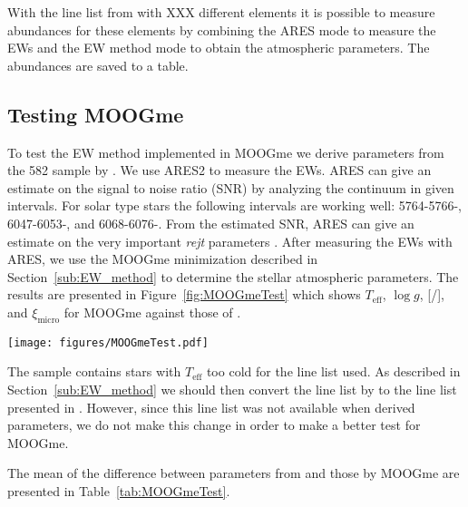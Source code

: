 \documentclass{aa}
\begin{document}
With the line list from \citet{Adibekyan...} with XXX different elements
it is possible to measure abundances for these elements by combining the
ARES mode to measure the EWs and the EW method mode to obtain the atmospheric
parameters. The abundances are saved to a table.


\subsection{Testing MOOGme}
\label{sub:Testing_MOOGme}
To test the EW method implemented in MOOGme we derive
parameters from the 582 sample by \citet{Sousa2011}. We use ARES2
to measure the EWs. ARES can give an estimate on the signal to
noise ratio (SNR) by analyzing the continuum in given intervals.
For solar type stars the following intervals are working well:
5764-5766-\angstrom, 6047-6053-\angstrom, and
6068-6076-\angstrom. From the estimated SNR, ARES can give
an estimate on the very important \emph{rejt} parameters
\citep[see][for more information]{Sousa2015a}. After measuring the EWs
with ARES, we use the MOOGme minimization described in
Section~\ref{sub:EW_method} to determine the stellar atmospheric parameters.
The results are presented in Figure~\ref{fig:MOOGmeTest} which shows
$T_\mathrm{eff}$, $\log g$, [/], and $\xi_\mathrm{micro}$
for MOOGme against those of \citet{Sousa2011}.

\begin{figure*}[tpb]
    \centering
    \texttt{[image: figures/MOOGmeTest.pdf]}
    \caption{Stellar atmospheric parameters derived by MOOGme compared
    to the sample by \citet{Sousa2011}.}
    \label{fig:MOOGmeTest}
\end{figure*}

The sample contains stars with $T_\mathrm{eff}$ too cold for the line
list used. As described in Section~\ref{sub:EW_method} we should then
convert the line list by \citet{Sousa2008a} to the line list presented
in \citet{Tsantaki2013}. However, since this line list was not available
when \citet{Sousa2011} derived parameters, we do not make this change
in order to make a better test for MOOGme.

The mean of the difference between parameters from \citet{Sousa2011} and
those by MOOGme are presented in Table~\ref{tab:MOOGmeTest}.
\end{document}
